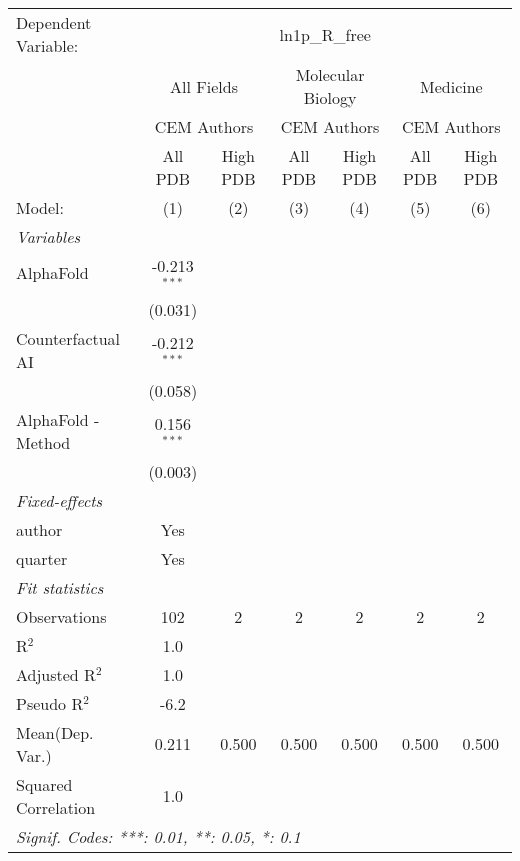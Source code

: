 \begingroup
\centering
\begin{tabular}{lcccccc}
   \tabularnewline \midrule \midrule
   Dependent Variable: & \multicolumn{6}{c}{ln1p\_R\_free}\\
 & \multicolumn{2}{c}{All Fields} & \multicolumn{2}{c}{Molecular Biology} & \multicolumn{2}{c}{Medicine} \\
\cmidrule(lr){2-3} \cmidrule(lr){4-5} \cmidrule(lr){6-7}
 & \multicolumn{2}{c}{CEM Authors} & \multicolumn{2}{c}{CEM Authors} & \multicolumn{2}{c}{CEM Authors} \\
\cmidrule(lr){2-3} \cmidrule(lr){4-5} \cmidrule(lr){6-7}
 & \multicolumn{1}{c}{All PDB} & \multicolumn{1}{c}{High PDB} & \multicolumn{1}{c}{All PDB} & \multicolumn{1}{c}{High PDB} & \multicolumn{1}{c}{All PDB} & \multicolumn{1}{c}{High PDB} \\
\cmidrule(lr){2-2} \cmidrule(lr){3-3} \cmidrule(lr){4-4} \cmidrule(lr){5-5} \cmidrule(lr){6-6} \cmidrule(lr){7-7}
   Model:              & (1)            & (2) & (3) & (4) & (5) & (6)\\  
   \midrule
   \emph{Variables}\\
   AlphaFold           & -0.213$^{***}$ &     &     &     &     &   \\   
                       & (0.031)        &     &     &     &     &   \\   
   Counterfactual AI   & -0.212$^{***}$ &     &     &     &     &   \\   
                       & (0.058)        &     &     &     &     &   \\   
   AlphaFold - Method  & 0.156$^{***}$  &     &     &     &     &   \\   
                       & (0.003)        &     &     &     &     &   \\   
   \midrule
   \emph{Fixed-effects}\\
   author              & Yes            &     &     &     &     & \\  
   quarter             & Yes            &     &     &     &     & \\  
   \midrule
   \emph{Fit statistics}\\
   Observations        & 102            & 2   & 2   & 2   & 2   & 2\\  
   R$^2$               & 1.0            &     &     &     &     & \\  
   Adjusted R$^2$      & 1.0            &     &     &     &     & \\  
   Pseudo R$^2$        & -6.2           &     &     &     &     & \\  
Mean(Dep. Var.) & 0.211 & 0.500 & 0.500 & 0.500 & 0.500 & 0.500 \\
   Squared Correlation & 1.0            &     &     &     &     & \\  
   \midrule \midrule
   \multicolumn{7}{l}{\emph{Signif. Codes: ***: 0.01, **: 0.05, *: 0.1}}\\
\end{tabular}
\par\endgroup
